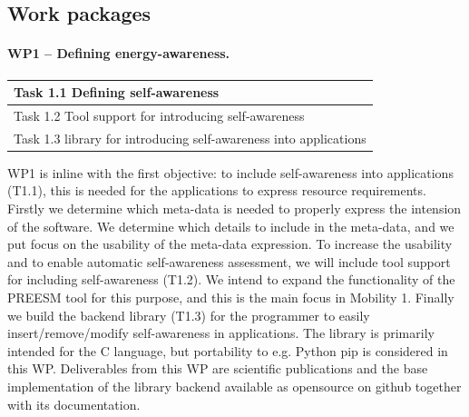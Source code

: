\documentclass{article}
\begin{document}
\subsection{Work packages}
\paragraph{WP1 -- Defining energy-awareness.}
\begin{table}
\vspace{-0.5cm}
\small
\begin{tabular}{ | l |}
\hline
{Task 1.1 Defining self-awareness}  \\ \hline
{Task 1.2 Tool support for introducing self-awareness}  \\ \hline
{Task 1.3 library for introducing self-awareness into applications}\\ \hline
\end{tabular}
\vspace{-0.3cm}
\end{table}
WP1 is inline with the first objective: to include self-awareness into applications (T1.1), this is needed for the applications to express resource requirements.
Firstly we determine which meta-data is needed to properly express the intension of the software.
We determine which details to include in the meta-data, and we put focus on the usability of the meta-data expression.
To increase the usability and to enable automatic self-awareness assessment, we will include tool support for including self-awareness (T1.2).
We intend to expand the functionality of the PREESM tool for this purpose, and this is the main focus in Mobility 1.
Finally we build the backend library (T1.3) for the programmer to easily insert/remove/modify self-awareness in applications.
The library is primarily intended for the C language, but portability to e.g. Python pip is considered in this WP.
Deliverables from this WP are scientific publications and the base implementation of the library backend available as opensource on github together with its documentation.
\end{document}
